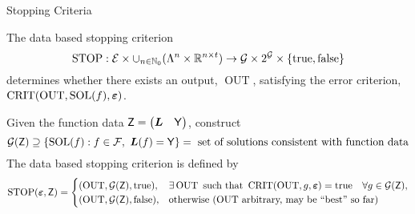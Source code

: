 \documentclass[10pt,compress,xcolor={usenames,dvipsnames},aspectratio=169]{beamer}
\DeclareMathOperator{\STOP}{STOP}
\DeclareMathOperator{\SOL}{SOL}
\DeclareMathOperator{\OUT}{OUT}
\DeclareMathOperator{\CRIT}{CRIT}
\newcommand{\ttrue}{\text{true}}
\newcommand{\tfalse}{\text{false}}
\begin{document}
\begin{frame}{Stopping Criteria}

\vspace{-5ex}
The \alert{data based} stopping criterion
\[
\STOP:  \ce  \times \cup_{n \in \natzero} (\Lambda^n \times \reals^{n\times t} ) \to \cg \times 2^\cg \times \{\ttrue, \tfalse \}
\]
determines whether there exists an output, $\OUT$, satisfying the error criterion, $\CRIT(\OUT,\SOL(f),\veps)$.   

Given the function data $\mathsf{Z} =\begin{pmatrix}\boldsymbol{L} & \mathsf{Y}\end{pmatrix}$,  construct 
\[
\cg(\mZ) \supseteq \{\SOL(f) :   f \in \cf, \ \vL(f) = \mY   \} = \text{ set of solutions consistent with function data}
\]
The data based stopping criterion is defined by
\[
\STOP(\veps,\mZ) = \begin{cases} 
	(\OUT,\cg(\mZ), \ttrue), & 
	\exists \OUT \text{ such that } \CRIT(\OUT,g,\veps) = \ttrue \quad \forall g \in \cg(\mZ), \\
	(\OUT,\cg(\mZ),\tfalse), & \text{otherwise ($\OUT$ arbitrary, may be ``best'' so far)}
	\end{cases}
\]

\end{frame}
\end{document}
